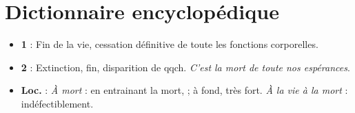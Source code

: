 
\section{Dictionnaire encyclopédique}

\begin{itemize}[leftmargin=1cm, label=, itemsep=1pt]
\item {\bf 1} : Fin de la vie, cessation définitive de toute les fonctions corporelles.
\item {\bf 2} : Extinction, fin, disparition de qqch. {\it C'est la mort de toute nos espérances}.
\item {\bf Loc.} : {\it À mort} : en entrainant la mort, ; à fond, très fort. {\it À la vie à la mort} : indéfectiblement.
\end{itemize}

